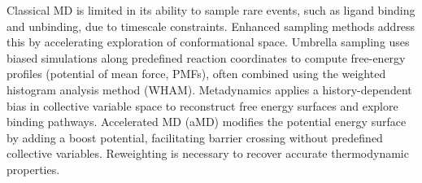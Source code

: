 \documentclass[12pt]{article}
\begin{document}
Classical MD is limited in its ability to sample rare events, such as ligand binding and unbinding, due to timescale constraints. Enhanced sampling methods address this by accelerating exploration of conformational space. Umbrella sampling uses biased simulations along predefined reaction coordinates to compute free-energy profiles (potential of mean force, PMFs), often combined using the weighted histogram analysis method (WHAM). Metadynamics applies a history-dependent bias in collective variable space to reconstruct free energy surfaces and explore binding pathways. Accelerated MD (aMD) modifies the potential energy surface by adding a boost potential, facilitating barrier crossing without predefined collective variables. Reweighting is necessary to recover accurate thermodynamic properties.




\end{document}
